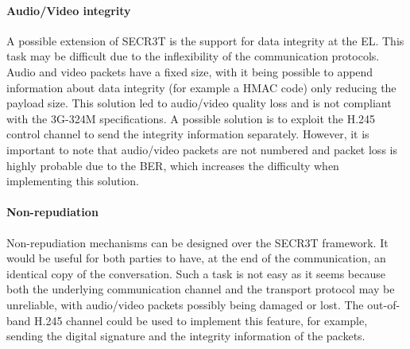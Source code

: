 \documentclass[10pt, conference, compsocconf]{IEEEtran}
\begin{document}
\paragraph{Audio/Video integrity}
A possible extension of SECR3T is the support for data integrity at the EL. This task may be difficult due to the inflexibility of the communication protocols. 
Audio and video packets have a fixed size, with it being possible to append information about data integrity (for example a HMAC code) only reducing the payload size.
This solution led to audio/video quality loss and is not compliant with the 3G-324M specifications.
A possible solution is to exploit the H.245 control channel to send the integrity information separately. However, it is important to note that audio/video packets are not numbered and packet loss is highly probable due to the BER, which increases the difficulty when implementing this solution.
\\

\paragraph{Non-repudiation}

Non-repudiation mechanisms can be designed over the SECR3T framework. It would be useful for both parties to have, at the end of the communication, an identical copy of the conversation. Such a task is not easy as it seems because both the underlying communication channel and the transport protocol may be unreliable, with audio/video packets possibly being damaged or lost. The out-of-band H.245 channel could be used to implement this feature, for example, sending the digital signature and the integrity information of the packets.

\end{document}
